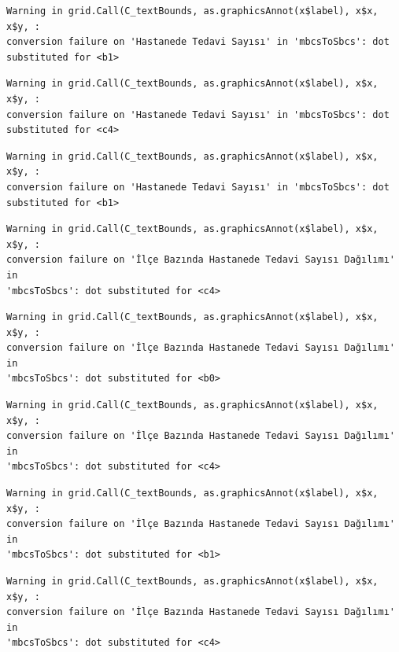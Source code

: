 \documentclass[
  11pt,
  a4paper,
  DIV=11,
  numbers=noendperiod]{scrartcl}
\begin{document}
\begin{verbatim}
Warning in grid.Call(C_textBounds, as.graphicsAnnot(x$label), x$x, x$y, :
conversion failure on 'Hastanede Tedavi Sayısı' in 'mbcsToSbcs': dot
substituted for <b1>
\end{verbatim}

\begin{verbatim}
Warning in grid.Call(C_textBounds, as.graphicsAnnot(x$label), x$x, x$y, :
conversion failure on 'Hastanede Tedavi Sayısı' in 'mbcsToSbcs': dot
substituted for <c4>
\end{verbatim}

\begin{verbatim}
Warning in grid.Call(C_textBounds, as.graphicsAnnot(x$label), x$x, x$y, :
conversion failure on 'Hastanede Tedavi Sayısı' in 'mbcsToSbcs': dot
substituted for <b1>
\end{verbatim}

\begin{verbatim}
Warning in grid.Call(C_textBounds, as.graphicsAnnot(x$label), x$x, x$y, :
conversion failure on 'İlçe Bazında Hastanede Tedavi Sayısı Dağılımı' in
'mbcsToSbcs': dot substituted for <c4>
\end{verbatim}

\begin{verbatim}
Warning in grid.Call(C_textBounds, as.graphicsAnnot(x$label), x$x, x$y, :
conversion failure on 'İlçe Bazında Hastanede Tedavi Sayısı Dağılımı' in
'mbcsToSbcs': dot substituted for <b0>
\end{verbatim}

\begin{verbatim}
Warning in grid.Call(C_textBounds, as.graphicsAnnot(x$label), x$x, x$y, :
conversion failure on 'İlçe Bazında Hastanede Tedavi Sayısı Dağılımı' in
'mbcsToSbcs': dot substituted for <c4>
\end{verbatim}

\begin{verbatim}
Warning in grid.Call(C_textBounds, as.graphicsAnnot(x$label), x$x, x$y, :
conversion failure on 'İlçe Bazında Hastanede Tedavi Sayısı Dağılımı' in
'mbcsToSbcs': dot substituted for <b1>
\end{verbatim}

\begin{verbatim}
Warning in grid.Call(C_textBounds, as.graphicsAnnot(x$label), x$x, x$y, :
conversion failure on 'İlçe Bazında Hastanede Tedavi Sayısı Dağılımı' in
'mbcsToSbcs': dot substituted for <c4>
\end{verbatim}
\end{document}
